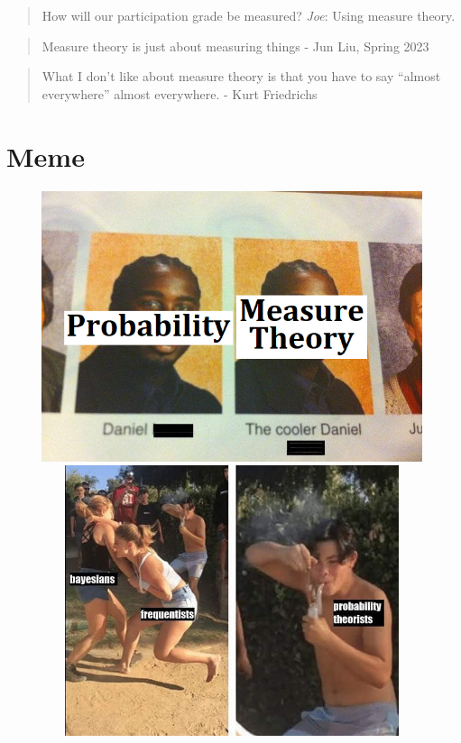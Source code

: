 \documentclass[
  letterpaper,
  DIV=11,
  numbers=noendperiod]{scrreprt}
\theoremstyle{definition}
\theoremstyle{plain}
\theoremstyle{remark}
\begin{document}

\begin{quote}
How will our participation grade be measured? \emph{Joe}: Using measure
theory.
\end{quote}

\begin{quote}
Measure theory is just about measuring things - Jun Liu, Spring 2023
\end{quote}

\begin{quote}
What I don't like about measure theory is that you have to say ``almost
everywhere'' almost everywhere. - Kurt Friedrichs
\end{quote}

\hypertarget{meme}{%
\section*{Meme}\label{meme}}


\includegraphics[width=5.20833in,height=3.125in]{./assets/img/meme/meme1.png}
\includegraphics[width=5.20833in,height=3.125in]{./assets/img/meme/meme3.jpeg}
\end{document}
